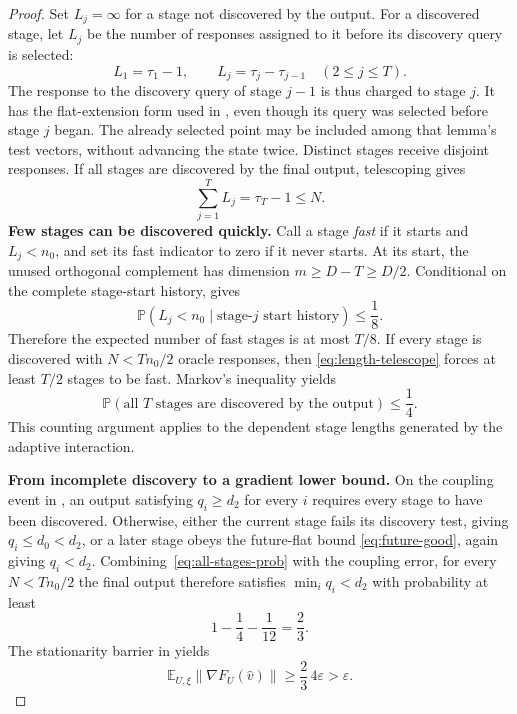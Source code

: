 \documentclass[11pt]{article}
\newcommand{\E}{\mathbb E}
\newcommand{\Pp}{\mathbb P}
\newcommand{\norm}[1]{\left\lVert #1\right\rVert}
\newcommand{\eps}{\varepsilon}
\theoremstyle{definition}
\theoremstyle{remark}
\begin{document}
\begin{proof}
Set $L_j=\infty$ for a stage not discovered by the output.  For a discovered
stage, let $L_j$ be the number of responses assigned to it before its
discovery query is selected:
\begin{equation}\label{eq:stage-lengths}
 L_1=\tau_1-1,
 \qquad
 L_j=\tau_j-\tau_{j-1}\quad(2\le j\le T).
\end{equation}
The response to the discovery query of stage $j-1$ is thus charged to
stage $j$.  It has the flat-extension form used in
, even though its query was selected before stage $j$
began.  The already selected point may be included among that lemma's test
vectors, without advancing the state twice.  Distinct stages receive disjoint
responses.  If all stages are discovered by the final output, telescoping gives
\begin{equation}\label{eq:length-telescope}
 \sum_{j=1}^TL_j=\tau_T-1\le N.
\end{equation}
\noindent\textbf{Few stages can be discovered quickly.}
Call a stage \emph{fast} if it starts and $L_j<n_0$, and set its fast
indicator to zero if it never starts.  At its start, the unused orthogonal
complement has dimension $m\ge D-T\ge D/2$.  Conditional on the complete
stage-start history,  gives
\begin{equation}\label{eq:fast-prob}
 \Pp(L_j<n_0\mid\text{stage-$j$ start history})\le\frac18.
\end{equation}
Therefore the expected number of fast stages is at most $T/8$.  If every stage
is discovered with $N<Tn_0/2$ oracle responses, then
\eqref{eq:length-telescope} forces at least $T/2$ stages to be fast.  Markov's
inequality yields
\begin{equation}\label{eq:all-stages-prob}
 \Pp(\text{all $T$ stages are discovered by the output})\le\frac14.
\end{equation}
This counting argument applies to the dependent stage lengths generated by the adaptive interaction.

\noindent\textbf{From incomplete discovery to a gradient lower bound.}
On the coupling event in , an output satisfying
$q_i\ge d_2$ for every $i$ requires every stage to have been discovered.
Otherwise, either the current stage fails its discovery test, giving
$q_i\le d_0<d_2$, or a later stage obeys the future-flat bound
\eqref{eq:future-good}, again giving $q_i<d_2$.
Combining~\eqref{eq:all-stages-prob} with the coupling error, for every
$N<Tn_0/2$ the final output therefore satisfies $\min_iq_i<d_2$ with
probability at least
\[
 1-\frac14-\frac1{12}=\frac23.
\]
The stationarity barrier in  yields
\[
 \E_{U,\xi}\norm{\nabla F_U(\widehat v)}
 \ge \frac23\,4\eps>\eps.
\]


\end{proof}
\end{document}
